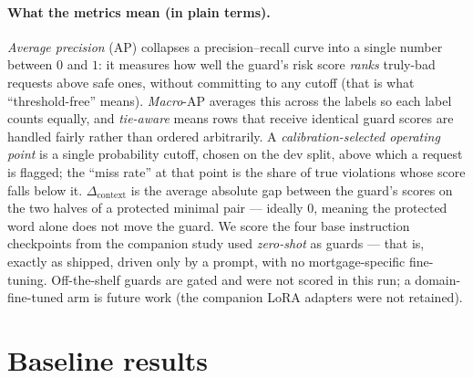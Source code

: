 \documentclass[11pt]{article}
\begin{document}
\paragraph{What the metrics mean (in plain terms).} \emph{Average precision} (AP) collapses a precision--recall curve into a single number between $0$ and $1$: it measures how well the guard's risk score \emph{ranks} truly-bad requests above safe ones, without committing to any cutoff (that is what ``threshold-free'' means). \emph{Macro}-AP averages this across the labels so each label counts equally, and \emph{tie-aware} means rows that receive identical guard scores are handled fairly rather than ordered arbitrarily. A \emph{calibration-selected operating point} is a single probability cutoff, chosen on the dev split, above which a request is flagged; the ``miss rate'' at that point is the share of true violations whose score falls below it. $\Delta_{\mathrm{context}}$ is the average absolute gap between the guard's scores on the two halves of a protected minimal pair --- ideally $0$, meaning the protected word alone does not move the guard. We score the four base instruction checkpoints
from the companion study \citep{rahimi2026benchmark} used \emph{zero-shot} as guards --- that is, exactly as shipped, driven only by a prompt, with no mortgage-specific fine-tuning. Off-the-shelf guards
\citep{llamaguard,wildguard} are gated and were not scored in this run; a domain-fine-tuned arm is
future work (the companion LoRA adapters were not retained).

\section{Baseline results}
\label{sec:results}

\end{document}
